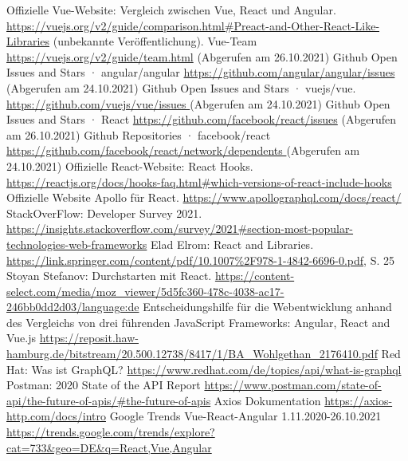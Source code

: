 \begin{thebibliography}{HR08}
   Offizielle Vue-Website: Vergleich zwischen Vue, React und Angular. \url{https://vuejs.org/v2/guide/comparison.html#Preact-and-Other-React-Like-Libraries} (unbekannte Veröffentlichung).
   Vue-Team \url{https://vuejs.org/v2/guide/team.html} (Abgerufen am 26.10.2021)
  Github Open Issues and Stars · angular/angular \url{ https://github.com/angular/angular/issues }  (Abgerufen am 24.10.2021)
   Github Open Issues and Stars · vuejs/vue. \url{ https://github.com/vuejs/vue/issues }  (Abgerufen am 24.10.2021)
   Github Open Issues and Stars · React \url{https://github.com/facebook/react/issues} (Abgerufen am 26.10.2021)
   Github Repositories · facebook/react \url{ https://github.com/facebook/react/network/dependents } (Abgerufen am 24.10.2021)
  Offizielle React-Website: React Hooks. \url{https://reactjs.org/docs/hooks-faq.html#which-versions-of-react-include-hooks}
  Offizielle Website Apollo für React. \url{https://www.apollographql.com/docs/react/}
  StackOverFlow: Developer Survey 2021. \url{https://insights.stackoverflow.com/survey/2021#section-most-popular-technologies-web-frameworks}
  Elad Elrom: React and Libraries. \url{https://link.springer.com/content/pdf/10.1007%2F978-1-4842-6696-0.pdf}, S. 25
  Stoyan Stefanov: Durchstarten mit React. \url{https://content-select.com/media/moz_viewer/5d5fc360-478c-4038-ac17-246bb0dd2d03/language:de}
  Entscheidungshilfe für die Webentwicklung anhand des Vergleichs von drei führenden JavaScript Frameworks: Angular, React and Vue.js \url{https://reposit.haw-hamburg.de/bitstream/20.500.12738/8417/1/BA_Wohlgethan_2176410.pdf}
  Red Hat: Was ist GraphQL? \url{https://www.redhat.com/de/topics/api/what-is-graphql}
  Postman: 2020 State of the API Report \url{https://www.postman.com/state-of-api/the-future-of-apis/#the-future-of-apis}
  Axios Dokumentation \url{https://axios-http.com/docs/intro}
  Google Trends Vue-React-Angular 1.11.2020-26.10.2021 \url{https://trends.google.com/trends/explore?cat=733&geo=DE&q=React,Vue,Angular}



\end{thebibliography}

